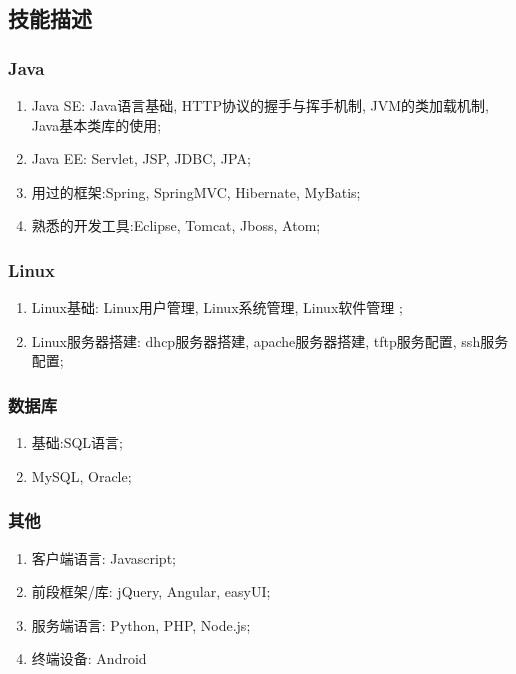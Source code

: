 \documentclass[12pt]{ctexart}
\begin{document}
\subsection{技能描述}
\label{sec-1-2}
\subsubsection{Java}
\label{sec-1-2-1}
\begin{enumerate}
\item Java SE: Java语言基础, HTTP协议的握手与挥手机制, JVM的类加载机制, Java基本类库的使用;
\item Java EE: Servlet, JSP, JDBC, JPA;
\item 用过的框架:Spring, SpringMVC, Hibernate, MyBatis;
\item 熟悉的开发工具:Eclipse, Tomcat, Jboss, Atom;
\end{enumerate}
\subsubsection{Linux}
\label{sec-1-2-2}
\begin{enumerate}
\item Linux基础: Linux用户管理, Linux系统管理, Linux软件管理 ;
\item Linux服务器搭建: dhcp服务器搭建, apache服务器搭建, tftp服务配置, ssh服务配置;
\end{enumerate}
\subsubsection{数据库}
\label{sec-1-2-3}
\begin{enumerate}
\item 基础:SQL语言;
\item MySQL, Oracle;
\end{enumerate}
\subsubsection{其他}
\label{sec-1-2-4}
\begin{enumerate}
\item 客户端语言: Javascript;
\item 前段框架/库: jQuery, Angular, easyUI;
\item 服务端语言: Python, PHP, Node.js;
\item 终端设备: Android
\end{enumerate}
\end{document}
